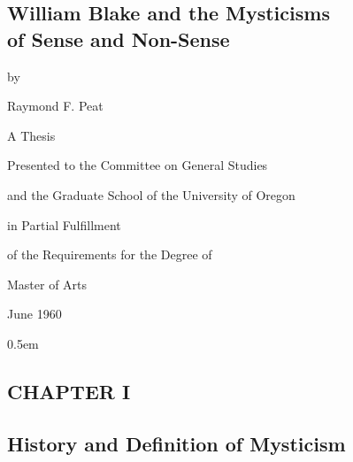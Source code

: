 \begin{center}
	\vspace*{\fill}

	\section*{William Blake and the Mysticisms \\ of Sense and Non-Sense}

	\vspace*{\fill}

	by

	\vspace*{\baselineskip}

	Raymond F. Peat

	\vspace*{\fill}

	A Thesis

	\vspace*{\baselineskip}

	Presented to the Committee on General Studies

	and the Graduate School of the University of Oregon

	in Partial Fulfillment

	of the Requirements for the Degree of

	Master of Arts

	\vspace*{\baselineskip}

	June 1960
	\vspace*{\fill}
\end{center}

\newpage

\tableofcontents

\newpage
\openup 0.5em

\begin{center}
	\section[Chapter I: History and Definition of Mysticism]{CHAPTER I}
	\subsection*{History and Definition of Mysticism}
\end{center}


